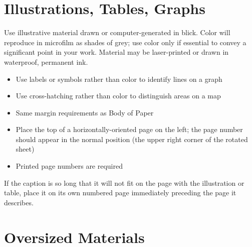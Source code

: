 \documentclass[draft]{ua-thesis}
\begin{document}
\chapter{Illustrations, Tables, Graphs}

Use illustrative material drawn or computer-generated in blick. Color will
reproduce in microfilm as shades of grey; use color only if essential to
convey a significant point in your work. Material may be laser-printed or
drawn in waterproof, permanent ink.
\begin{itemize}
   \item Use labels or symbols rather than color to identify lines on a graph
   \item Use cross-hatching rather than color to distinguish areas on a map
   \item Same margin requirements as Body of Paper
   \item Place the top of a horizontally-oriented page on the left; the page
     number should appear in the normal position (the upper right corner of
     the rotated sheet)
   \item Printed page numbers are required
\end{itemize}
If the caption is so long that it will not fit on the page with the
illustration or table, place it on its own numbered page immediately
preceding the page it describes.

\chapter{Oversized Materials}
\end{document}
